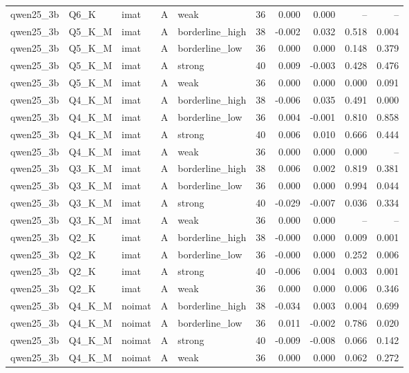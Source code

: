 \begin{tabular}{lllllrrrrr}
qwen25\_3b & Q6\_K & imat & A & weak & 36 & 0.000 & 0.000 & -- & -- \\
qwen25\_3b & Q5\_K\_M & imat & A & borderline\_high & 38 & -0.002 & 0.032 & 0.518 & 0.004 \\
qwen25\_3b & Q5\_K\_M & imat & A & borderline\_low & 36 & 0.000 & 0.000 & 0.148 & 0.379 \\
qwen25\_3b & Q5\_K\_M & imat & A & strong & 40 & 0.009 & -0.003 & 0.428 & 0.476 \\
qwen25\_3b & Q5\_K\_M & imat & A & weak & 36 & 0.000 & 0.000 & 0.000 & 0.091 \\
qwen25\_3b & Q4\_K\_M & imat & A & borderline\_high & 38 & -0.006 & 0.035 & 0.491 & 0.000 \\
qwen25\_3b & Q4\_K\_M & imat & A & borderline\_low & 36 & 0.004 & -0.001 & 0.810 & 0.858 \\
qwen25\_3b & Q4\_K\_M & imat & A & strong & 40 & 0.006 & 0.010 & 0.666 & 0.444 \\
qwen25\_3b & Q4\_K\_M & imat & A & weak & 36 & 0.000 & 0.000 & 0.000 & -- \\
qwen25\_3b & Q3\_K\_M & imat & A & borderline\_high & 38 & 0.006 & 0.002 & 0.819 & 0.381 \\
qwen25\_3b & Q3\_K\_M & imat & A & borderline\_low & 36 & 0.000 & 0.000 & 0.994 & 0.044 \\
qwen25\_3b & Q3\_K\_M & imat & A & strong & 40 & -0.029 & -0.007 & 0.036 & 0.334 \\
qwen25\_3b & Q3\_K\_M & imat & A & weak & 36 & 0.000 & 0.000 & -- & -- \\
qwen25\_3b & Q2\_K & imat & A & borderline\_high & 38 & -0.000 & 0.000 & 0.009 & 0.001 \\
qwen25\_3b & Q2\_K & imat & A & borderline\_low & 36 & -0.000 & 0.000 & 0.252 & 0.006 \\
qwen25\_3b & Q2\_K & imat & A & strong & 40 & -0.006 & 0.004 & 0.003 & 0.001 \\
qwen25\_3b & Q2\_K & imat & A & weak & 36 & 0.000 & 0.000 & 0.006 & 0.346 \\
qwen25\_3b & Q4\_K\_M & noimat & A & borderline\_high & 38 & -0.034 & 0.003 & 0.004 & 0.699 \\
qwen25\_3b & Q4\_K\_M & noimat & A & borderline\_low & 36 & 0.011 & -0.002 & 0.786 & 0.020 \\
qwen25\_3b & Q4\_K\_M & noimat & A & strong & 40 & -0.009 & -0.008 & 0.066 & 0.142 \\
qwen25\_3b & Q4\_K\_M & noimat & A & weak & 36 & 0.000 & 0.000 & 0.062 & 0.272 \\

\end{tabular}

